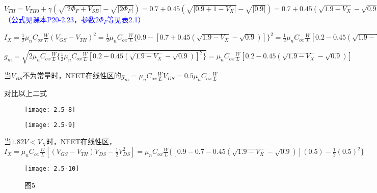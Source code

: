 {	\scalebox{3}{（e）}
	
	$V_{TH}=V_{TH0}+\gamma(\sqrt{|2\Phi_F+V_{SB}|}-\sqrt{|2\Phi_F|})=0.7+0.45(\sqrt{|0.9+1-V_{X}|}-\sqrt{|0.9|})=0.7+0.45(\sqrt{1.9-V_{X}}-\sqrt{0.9})$\textcolor{blue}{（公式见课本P20-2.23，参数$2\Phi_F$等见表2.1）}
	
	$I_X=\frac{1}{2}\mu_nC_{ox}\frac{W}{L}(V_{GS}-V_{TH})^2=\frac{1}{2}\mu_nC_{ox}\frac{W}{L}\{0.9-[0.7+0.45(\sqrt{1.9-V_{X}}-\sqrt{0.9})]\}^2=\frac{1}{2}\mu_nC_{ox}\frac{W}{L}[0.2-0.45(\sqrt{1.9-V_{X}}-\sqrt{0.9})]^2$
	
	$g_m=\sqrt{2\mu_nC_{ox}\frac{W}{L}\{\frac{1}{2}\mu_nC_{ox}\frac{W}{L}[0.2-0.45(\sqrt{1.9-V_{X}}-\sqrt{0.9})]^2\}}=\mu_nC_{ox}\frac{W}{L}[0.2-0.45(\sqrt{1.9-V_{X}}-\sqrt{0.9})]$
	
	当$V_{BS}$不为常量时，NFET在线性区的$g_m=\mu_nC_{ox}\frac{W}{L}V_{DS}=0.5\mu_nC_{ox}\frac{W}{L}$
	
	对比以上二式
	
						\begin{figure}[H] %
		\begin{minipage}{\linewidth}
			\texttt{[image: 2.5-8]}
		\end{minipage}
	\end{figure}
	
						\begin{figure}[H] %
		\begin{minipage}{\linewidth}
			\texttt{[image: 2.5-9]}
		\end{minipage}
	\end{figure}
	
	当$1.82V<V_X$时，NFET在线性区，$I_X=\mu_nC_{ox}\frac{W}{L}[(V_{GS}-V_{TH})V_{DS}-\frac{1}{2}V_{DS}^2]=\mu_nC_{ox}\frac{W}{L}\{[0.9-0.7-0.45(\sqrt{1.9-V_{X}}-\sqrt{0.9})](0.5)-\frac{1}{2}(0.5)^2\}$
	
							\begin{figure}[H] %
		\begin{minipage}{\linewidth}
			\texttt{[image: 2.5-10]}
		\end{minipage}
		\caption*{图5} %
	\end{figure}
	

	
}











\color{black}{}